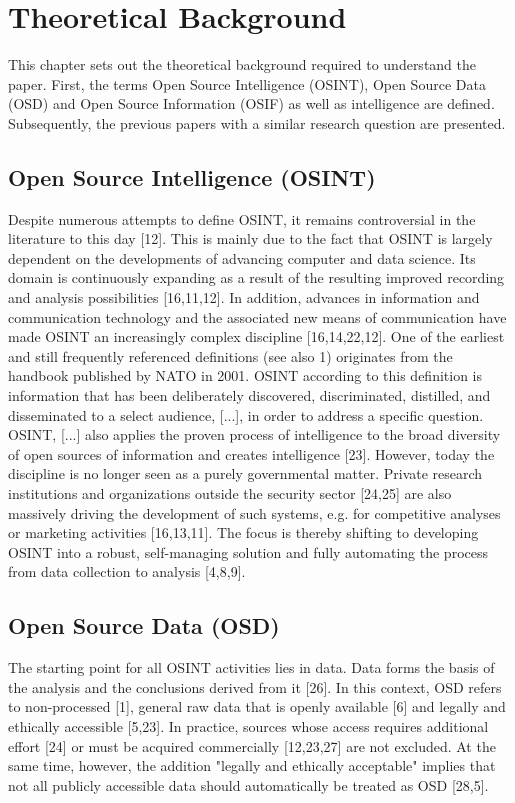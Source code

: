 \documentclass[10pt]{article}
\begin{document}
\section{Theoretical Background}

This chapter sets out the theoretical background required to understand the paper. First, the terms Open Source Intelligence (OSINT), Open Source Data (OSD) and Open Source Information (OSIF) as well as intelligence are defined. Subsequently, the previous papers with a similar research question are presented.

\subsection{Open Source Intelligence (OSINT)}

Despite numerous attempts to define OSINT, it remains controversial in the literature to this day [12]. This is mainly due to the fact that OSINT is largely dependent on the developments of advancing computer and data science. Its domain is continuously expanding as a result of the resulting improved recording and analysis possibilities [16,11,12]. In addition, advances in information and communication technology and the associated new means of communication have made OSINT an increasingly complex discipline [16,14,22,12]. One of the earliest and still frequently referenced definitions (see also 1) originates from the handbook published by NATO in 2001. OSINT according to this definition is information that has been deliberately discovered, discriminated, distilled, and disseminated to a select audience, [...], in order to address a specific question. OSINT, [...] also applies the proven process of intelligence to the broad diversity of open sources of information and creates intelligence [23]. However, today the discipline is no longer seen as a purely governmental matter. Private research institutions and organizations outside the security sector [24,25] are also massively driving the development of such systems, e.g. for competitive analyses or marketing activities [16,13,11]. The focus is thereby shifting to developing OSINT into a robust, self-managing solution and fully automating the process from data collection to analysis [4,8,9].

\subsection{Open Source Data (OSD)}

The starting point for all OSINT activities lies in data. Data forms the basis of the analysis and the conclusions derived from it [26]. In this context, OSD refers to non-processed [1], general raw data that is openly available [6] and legally and ethically accessible [5,23]. In practice, sources whose access requires additional effort [24] or must be acquired commercially [12,23,27] are not excluded. At the same time, however, the addition "legally and ethically acceptable" implies that not all publicly accessible data should automatically be treated as OSD [28,5].
\end{document}
